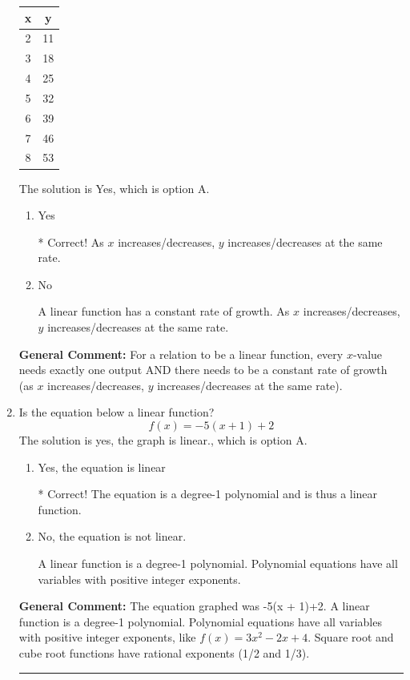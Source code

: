 \documentclass{extbook}[14pt]
\newcommand{\litem}[1]{\item #1

\rule{\textwidth}{0.4pt}}
\begin{document}
\begin{enumerate}
{\begin{tabular}{c|c}
x &y\tabularnewline \hline
2 &11\tabularnewline \hline
3 &18\tabularnewline \hline
4 &25\tabularnewline \hline
5 &32\tabularnewline \hline
6 &39\tabularnewline \hline
7 &46\tabularnewline \hline
8 &53\end{tabular}The solution is Yes, which is option A.

\begin{enumerate}[label=\Alph*.]
\item Yes

* Correct! As $x$ increases/decreases, $y$ increases/decreases at the same rate.
\item No

A linear function has a constant rate of growth. As $x$ increases/decreases, $y$ increases/decreases at the same rate.
\end{enumerate}


\textbf{General Comment:} For a relation to be a linear function, every $x$-value needs exactly one output AND there needs to be a constant rate of growth (as $x$ increases/decreases, $y$ increases/decreases at the same rate).
}
\litem{
Is the equation below a linear function?
\[ f(x) = -5(x + 1)+2 \]The solution is yes, the graph is linear., which is option A.

\begin{enumerate}[label=\Alph*.]
\item Yes, the equation is linear

* Correct! The equation is a degree-1 polynomial and is thus a linear function.
\item No, the equation is not linear.

A linear function is a degree-1 polynomial. Polynomial equations have all variables with positive integer exponents.
\end{enumerate}


\textbf{General Comment:} The equation graphed was -5(x + 1)+2. A linear function is a degree-1 polynomial. Polynomial equations have all variables with positive integer exponents, like $f(x) = 3x^2-2x+4$. Square root and cube root functions have rational exponents (1/2 and 1/3).
}
\end{enumerate}
\end{document}
